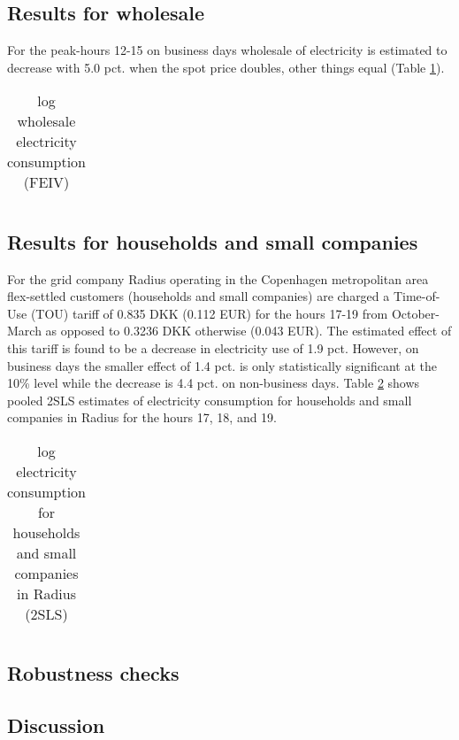 \label{sec:results}
\subsection{Results for wholesale}
\label{subsec:r_wholesale}
For the peak-hours 12-15 on business days wholesale of electricity is estimated to decrease with 5.0 pct. when the spot price doubles, other things equal (Table \ref{tab:ws_preferred}).
\begin{table}[H]
  \vspace{-0.0cm}
  \centering
  \caption{log wholesale electricity consumption (FEIV)}
  \footnotesize
    \begin{tabular}{lc}
      \toprule
        
    \end{tabular}
  \label{tab:ws_preferred}
  \vspace{-0.0cm}
\end{table}

\subsection{Results for households and small companies}
For the grid company Radius operating in the Copenhagen metropolitan area flex-settled customers (households and small companies) are charged a Time-of-Use (TOU) tariff of 0.835 DKK (0.112 EUR) for the hours 17-19 from October-March as opposed to 0.3236 DKK otherwise (0.043 EUR). The estimated effect of this tariff is found to be a decrease in electricity use of 1.9 pct. However, on business days the smaller effect of 1.4 pct. is only statistically significant at the 10\% level while the decrease is 4.4 pct. on non-business days. Table \ref{tab:hh_17-19} shows pooled 2SLS estimates of electricity consumption for households and small companies in Radius for the hours 17, 18, and 19.
\label{subsec:r_wholesale}
\begin{table}[H]
  \vspace{-0.0cm}
  \centering
  \caption{log electricity consumption for households and small companies in Radius (2SLS)}
  \footnotesize
    \begin{tabular}{lccc}
      \toprule
        
    \end{tabular}
  \label{tab:hh_17-19}
  \vspace{-0.0cm}
\end{table}


\subsection{Robustness checks}
\label{subsec:r_robustness}


\subsection{Discussion}
\label{subsec:discussion}
